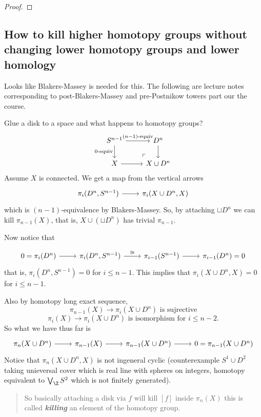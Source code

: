 \begin{remark}
\begin{proof}
\end{proof}

\subsection{How to kill higher homotopy groups without changing lower homotopy groups and lower homology}

{\color{cyan}Looks like Blakers-Massey is needed for this. The following are lecture notes corresponding to post-Blakers-Massey and pre-Postnikow towers part our the course.}

Glue a disk to a space and what happens to homotopy groups?
\[\begin{tikzcd}
	S^{n-1}\arrow[r,"(n-1)\text{-equiv}"]\arrow[d,"0\text{-equiv}",swap]&D^n\arrow[d]\\
	X\arrow[r]&X\cup D^n\arrow[ul, phantom, "\ulcorner", very near start]
\end{tikzcd}\]
Assume $X$ is connected. We get a map from the vertical arrows
\[\begin{tikzcd}
	\pi_i(D^n,S^{n-1})\arrow[r]&\pi_i(X\cup D^n,X)
\end{tikzcd}\]
which is $(n-1)$-equivalence by Blakers-Massey. So, by attaching $\sqcup D^n$ we can kill $\pi_{n-1}(X)$, that is, $X\cup(\sqcup D^n)$ has trivial $\pi_{n-1}$.

Now notice that

\[\begin{tikzcd}
	0=\pi_i(D^n)\arrow[r]&\pi_i(D^n,S^{n-1})\arrow[r,"\cong"]&\pi_{i-1}(S^{n-1})\arrow[r]&\pi_{i-1}(D^n)=0
\end{tikzcd}\]
that is, $\pi_i(D^n,S^{n-1})=0$ for $i\leq n-1$. This implies that $\pi_i(X\cup D^n,X)=0$ for $i\leq n-1$.

Also by homotopy long exact sequence,
\[\pi_{n-1}(X)\to \pi_i(X\cup D^n)\text{ is sujrective}\]
\[\pi_i(X)\to \pi_{i}(X\cup D^n)\text{ is isomorphism for }i\leq n-2.\]
So what we have thus far is
\[\begin{tikzcd}
	\pi_n(X\cup D^n)\arrow[r]&\pi_{n-1}(X)\arrow[r]&\pi_{n-1}(X\cup D^n)\arrow[r]&0=\pi_{n-1}(X\cup D^n)
\end{tikzcd}\]
Notice that $\pi_n(X\cup D^n,X)$ is not ingeneral cyclic (counterexample $S^1\cup D^2$ taking unieversal cover which is real line with spheres on integers, homotopy equivalent to $\bigvee_\Z S^2$ which is not finitely generated).

\begin{quote}
	{\color{red} So basically attaching a disk via $f$ will kill $[f]$ inside $\pi_n(X)$ this is called \textbf{\textit{killing}} an element of the homotopy group.}
\end{quote}


\end{remark}
